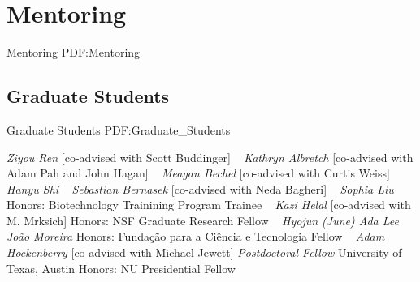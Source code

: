 \section
{Mentoring}
{Mentoring}
{PDF:Mentoring}

\subsection
{Graduate Students}
{Graduate Students}
{PDF:Graduate_Students}

\GapNoBreak
{}
\textit{Ziyou Ren}
    [co-advised with Scott Buddinger]
\newline
~
\Gap{}
\textit{Kathryn Albretch}
    [co-advised with Adam Pah and John Hagan]
\newline
~
\Gap{}
\textit{Meagan Bechel}
    [co-advised with Curtis Weiss]
\newline
~
\Gap{}
\textit{Hanyu Shi}
\newline
~
\Gap{}
\textit{Sebastian Bernasek}
    [co-advised with Neda Bagheri]
\newline
~
\Gap{}
\textit{Sophia Liu}
\newline
    {\footnotesize Honors: Biotechnology Trainining Program Trainee}
    \newline
~
\Gap{}
\textit{Kazi Helal}
    [co-advised with M. Mrksich]
\newline
    {\footnotesize Honors: NSF Graduate Research Fellow}
    \newline
~
\Gap{}
\textit{Hyojun (June) Ada Lee}
\newline
~
\Gap{}
\textit{Jo\~ao Moreira}
\newline
    {\footnotesize Honors: Funda\c{c}\~ao para a Ci\^encia e Tecnologia Fellow}
    \newline
~
\Gap{}
\textit{Adam Hockenberry}
    [co-advised with Michael Jewett]
\newline
    \textit{Postdoctoral Fellow}
    \newline
    University of Texas, Austin
    \newline
    {\footnotesize Honors: NU Presidential Fellow}
